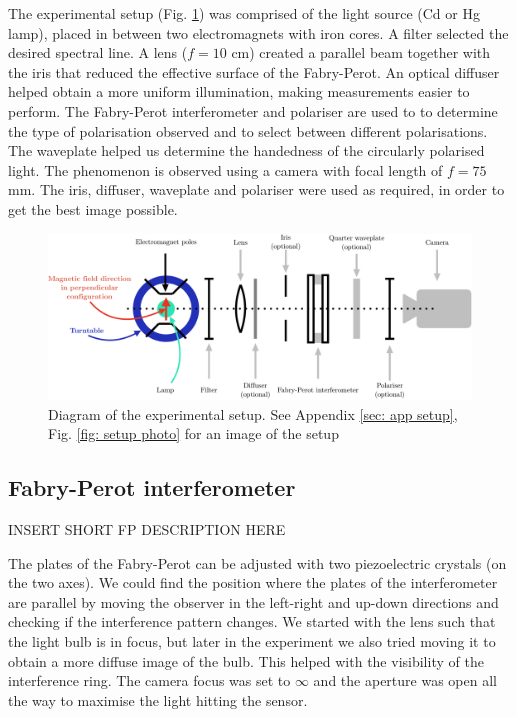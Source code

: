 \documentclass[11pt]{article}
\begin{document}
The experimental setup (Fig. \ref{fig: setup}) was comprised of the light source (Cd or Hg lamp), placed in between two electromagnets with iron cores. A filter selected the desired spectral line. A lens ($f = 10$ \si{cm}) created a parallel beam together with the iris that reduced the effective surface of the Fabry-Perot. An optical diffuser helped obtain a more uniform illumination, making measurements easier to perform. The Fabry-Perot interferometer and polariser are used to to determine the type of polarisation observed and to select between different polarisations. The waveplate helped us determine the handedness of the circularly polarised light. The phenomenon is observed using a camera with focal length of $f = 75$ \si{mm}. The iris, diffuser, waveplate and polariser were used as required, in order to get the best image possible. 

\begin{figure}
    \centering
    \includegraphics[width=0.8\linewidth]{setup2.png}
    \captionsetup{justification=centering}
    \caption{Diagram of the experimental setup. See Appendix \ref{sec: app setup}, Fig. \ref{fig: setup photo} for an image of the setup}
    \label{fig: setup}    
\end{figure}

\subsection{Fabry-Perot interferometer}
INSERT SHORT FP DESCRIPTION HERE

The plates of the Fabry-Perot can be adjusted with two piezoelectric crystals (on the two axes). We could find the position where the plates of the interferometer are parallel by moving the observer in the left-right and up-down directions and checking if the interference pattern changes. We started with the lens such that the light bulb is in focus, but later in the experiment we also tried moving it to obtain a more diffuse image of the bulb. This helped with the visibility of the interference ring. The camera focus was set to $\infty$ and the aperture was open all the way to maximise the light hitting the sensor. 
\label{sec: d}
\end{document}
